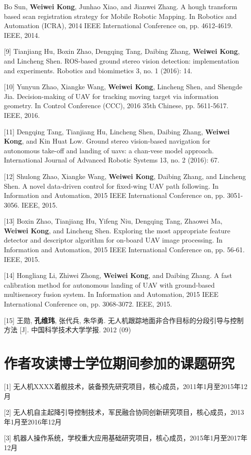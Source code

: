 \begin{resume}
[8] Bo Sun, \textbf{Weiwei Kong}, Junhao Xiao, and Jianwei Zhang. A hough transform based scan registration strategy for Mobile Robotic Mapping. In Robotics and Automation (ICRA), 2014 IEEE International Conference on, pp. 4612-4619. IEEE, 2014. 

[9] Tianjiang Hu, Boxin Zhao, Dengqing Tang, Daibing Zhang, \textbf{Weiwei Kong}, and Lincheng Shen. ROS-based ground stereo vision detection: implementation and experiments. Robotics and biomimetics 3, no. 1 (2016): 14.

[10] Yunyun Zhao, Xiangke Wang, \textbf{Weiwei Kong}, Lincheng Shen, and Shengde Jia. Decision-making of UAV for tracking moving target via information geometry. In Control Conference (CCC), 2016 35th Chinese, pp. 5611-5617. IEEE, 2016.

[11] Dengqing Tang, Tianjiang Hu, Lincheng Shen, Daibing Zhang, \textbf{Weiwei Kong}, and Kin Huat Low. Ground stereo vision-based navigation for autonomous take-off and landing of uavs: a chan-vese model approach. International Journal of Advanced Robotic Systems 13, no. 2 (2016): 67.

[12] Shulong Zhao, Xiangke Wang, \textbf{Weiwei Kong}, Daibing Zhang, and Lincheng Shen. A novel data-driven control for fixed-wing UAV path following. In Information and Automation, 2015 IEEE International Conference on, pp. 3051-3056. IEEE, 2015.

[13] Boxin Zhao, Tianjiang Hu, Yifeng Niu, Dengqing Tang, Zhaowei Ma, \textbf{Weiwei Kong}, and Lincheng Shen. Exploring the most appropriate feature detector and descriptor algorithm for on-board UAV image processing. In Information and Automation, 2015 IEEE International Conference on, pp. 56-61. IEEE, 2015.

[14] Hongliang Li, Zhiwei Zhong, \textbf{Weiwei Kong}, and Daibing Zhang. A fast calibration method for autonomous landing of UAV with ground-based multisensory fusion system. In Information and Automation, 2015 IEEE International Conference on, pp. 3068-3072. IEEE, 2015.

[15] 王勋, \textbf{孔维玮}, 张代兵, 朱华勇. 无人机跟踪地面非合作目标的分段引导与控制方法 [J]. 中国科学技术大学学报. 2012 (09)

\section*{作者攻读博士学位期间参加的课题研究} %

[1] 无人机XXXX着舰技术，装备预先研究项目，核心成员，2011年1月至2015年12月

[2] 无人机自主起降引导控制技术，军民融合协同创新研究项目，核心成员，2013年1月至2016年12月

[3] 机器人操作系统，学校重大应用基础研究项目，核心成员，2015年1月至2017年12月


%
%


\end{resume}
